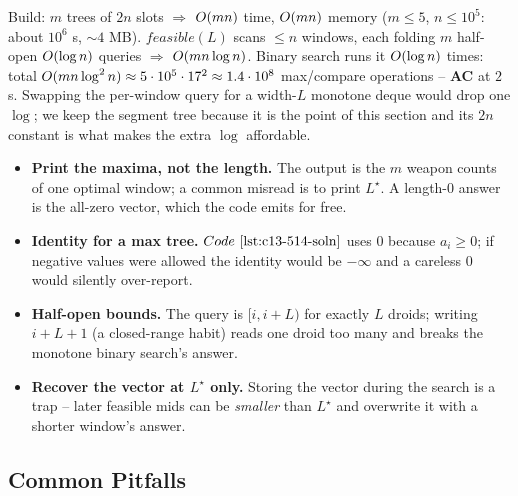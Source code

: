 \begin{complexitybox}
Build: \(m\) trees of \(2n\) slots \(\Rightarrow\) \(O(mn)\) time,
\(O(mn)\) memory (\(m\le5\), \(n\le10^5\): about \(10^6\) s,
\(\sim 4\) MB).  \(\mathit{feasible}(L)\) scans \(\le n\) windows, each folding
\(m\) half-open \(O(\log n)\) queries \(\Rightarrow\) \(O(mn\log n)\).
Binary search runs it \(O(\log n)\) times: total \(O(mn\log^2 n)\approx
5\cdot10^5\cdot 17^2 \approx 1.4\cdot10^8\) max/compare operations -- \textbf{AC}
at \(2\) s.  Swapping the per-window query for a width-\(L\) monotone deque would
drop one \(\log\); we keep the segment tree because it is the point of this
section and its \(2n\) constant is what makes the extra \(\log\) affordable.
\end{complexitybox}

\begin{hardeningbox}
\begin{itemize}[nosep,leftmargin=1.4em]
  \item \textbf{Print the maxima, not the length.}  The output is the \(m\) weapon
        counts of one optimal window; a common misread is to print \(L^\star\).
        A length-\(0\) answer is the all-zero vector, which the code emits for free.
  \item \textbf{Identity for a max tree.}  \(\coderef{c13-514-soln}\) uses \(0\)
        because \(a_i\ge0\); if negative values were allowed the identity would be
        \(-\infty\) and a careless \(0\) would silently over-report.
  \item \textbf{Half-open bounds.}  The query is \([i, i{+}L)\) for exactly \(L\)
        droids; writing \(i{+}L{+}1\) (a closed-range habit) reads one droid too
        many and breaks the monotone binary search's answer.
  \item \textbf{Recover the vector at \(L^\star\) only.}  Storing the vector during
        the search is a trap -- later feasible mids can be \emph{smaller} than
        \(L^\star\) and overwrite it with a shorter window's answer.
\end{itemize}
\end{hardeningbox}

\subsection{Common Pitfalls}

